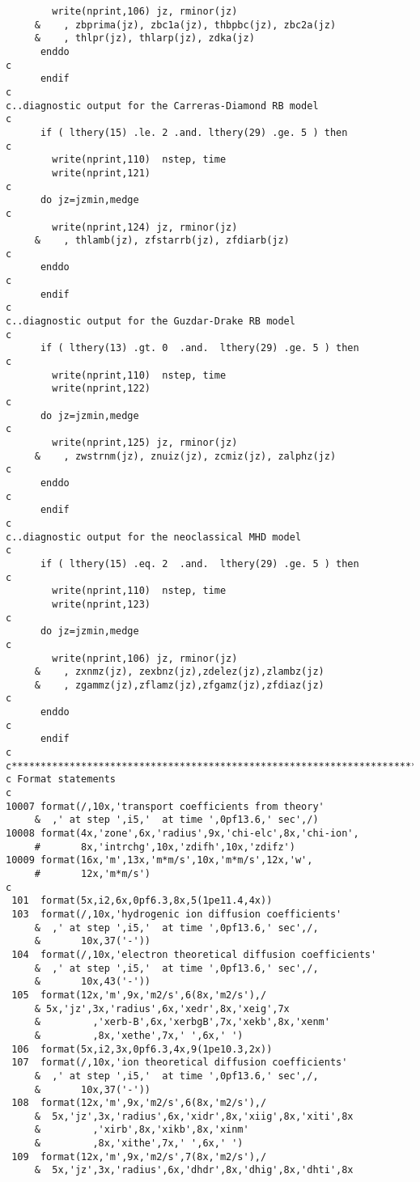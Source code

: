 \begin{verbatim}
        write(nprint,106) jz, rminor(jz)
     &    , zbprima(jz), zbc1a(jz), thbpbc(jz), zbc2a(jz)
     &    , thlpr(jz), thlarp(jz), zdka(jz)
      enddo
c
      endif
c
c..diagnostic output for the Carreras-Diamond RB model
c
      if ( lthery(15) .le. 2 .and. lthery(29) .ge. 5 ) then
c
        write(nprint,110)  nstep, time
        write(nprint,121)
c
      do jz=jzmin,medge
c
        write(nprint,124) jz, rminor(jz)
     &    , thlamb(jz), zfstarrb(jz), zfdiarb(jz)
c
      enddo
c
      endif
c
c..diagnostic output for the Guzdar-Drake RB model
c
      if ( lthery(13) .gt. 0  .and.  lthery(29) .ge. 5 ) then
c
        write(nprint,110)  nstep, time
        write(nprint,122)
c
      do jz=jzmin,medge
c
        write(nprint,125) jz, rminor(jz)
     &    , zwstrnm(jz), znuiz(jz), zcmiz(jz), zalphz(jz)
c
      enddo
c
      endif
c
c..diagnostic output for the neoclassical MHD model
c
      if ( lthery(15) .eq. 2  .and.  lthery(29) .ge. 5 ) then
c
        write(nprint,110)  nstep, time
        write(nprint,123)
c
      do jz=jzmin,medge
c
        write(nprint,106) jz, rminor(jz)
     &    , zxnmz(jz), zexbnz(jz),zdelez(jz),zlambz(jz)
     &    , zgammz(jz),zflamz(jz),zfgamz(jz),zfdiaz(jz)
c
      enddo
c
      endif
c
c**********************************************************************c
c Format statements
c
10007 format(/,10x,'transport coefficients from theory'
     &  ,' at step ',i5,'  at time ',0pf13.6,' sec',/)
10008 format(4x,'zone',6x,'radius',9x,'chi-elc',8x,'chi-ion',
     #       8x,'intrchg',10x,'zdifh',10x,'zdifz')
10009 format(16x,'m',13x,'m*m/s',10x,'m*m/s',12x,'w',
     #       12x,'m*m/s')
c
 101  format(5x,i2,6x,0pf6.3,8x,5(1pe11.4,4x))
 103  format(/,10x,'hydrogenic ion diffusion coefficients'
     &  ,' at step ',i5,'  at time ',0pf13.6,' sec',/,
     &       10x,37('-'))
 104  format(/,10x,'electron theoretical diffusion coefficients'
     &  ,' at step ',i5,'  at time ',0pf13.6,' sec',/,
     &       10x,43('-'))
 105  format(12x,'m',9x,'m2/s',6(8x,'m2/s'),/
     & 5x,'jz',3x,'radius',6x,'xedr',8x,'xeig',7x
     &         ,'xerb-B',6x,'xerbgB',7x,'xekb',8x,'xenm'
     &         ,8x,'xethe',7x,' ',6x,' ')
 106  format(5x,i2,3x,0pf6.3,4x,9(1pe10.3,2x))
 107  format(/,10x,'ion theoretical diffusion coefficients'
     &  ,' at step ',i5,'  at time ',0pf13.6,' sec',/,
     &       10x,37('-'))
 108  format(12x,'m',9x,'m2/s',6(8x,'m2/s'),/
     &  5x,'jz',3x,'radius',6x,'xidr',8x,'xiig',8x,'xiti',8x
     &         ,'xirb',8x,'xikb',8x,'xinm'
     &         ,8x,'xithe',7x,' ',6x,' ')
 109  format(12x,'m',9x,'m2/s',7(8x,'m2/s'),/
     &  5x,'jz',3x,'radius',6x,'dhdr',8x,'dhig',8x,'dhti',8x

\end{verbatim}
